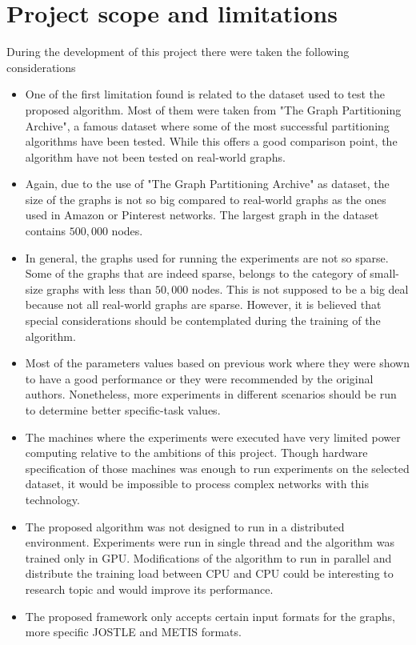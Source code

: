 \section{Project scope and limitations}
During the development of this project there were taken the following considerations
\begin{itemize}
    \item One of the first limitation found is related to the dataset used to test the proposed algorithm. Most of them were taken from "The Graph Partitioning Archive", a famous dataset where some of the most successful partitioning algorithms have been tested. While this offers a good comparison point, the algorithm have not been tested on real-world graphs.
    \item Again, due to the use of "The Graph Partitioning Archive" as dataset, the size of the graphs is not so big compared to real-world graphs as the ones used in Amazon or Pinterest networks. The largest graph in the dataset contains $500,000$ nodes.
    \item In general, the graphs used for running the experiments are not so sparse. Some of the graphs that are indeed sparse, belongs to the category of small-size graphs with less than $50,000$ nodes. This is not supposed to be a big deal because not all real-world graphs are sparse. However, it is believed that special considerations should be contemplated during the training of the algorithm.
    \item Most of the parameters values based on previous work where they were shown to have a good performance or they were recommended by the original authors. Nonetheless, more experiments in different scenarios should be run to determine better specific-task values.
    \item The machines where the experiments were executed have very limited power computing relative to the ambitions of this project. Though hardware specification of those machines was enough to run experiments on the selected dataset, it would be impossible to process complex networks with this technology.
    \item The proposed algorithm was not designed to run in a distributed environment. Experiments were run in single thread and the algorithm was trained only in GPU. Modifications of the algorithm to run in parallel and distribute the training load between CPU and CPU could be interesting to research topic and would improve its performance.
    \item The proposed framework only accepts certain input formats for the graphs, more specific JOSTLE and METIS formats.
\end{itemize}

